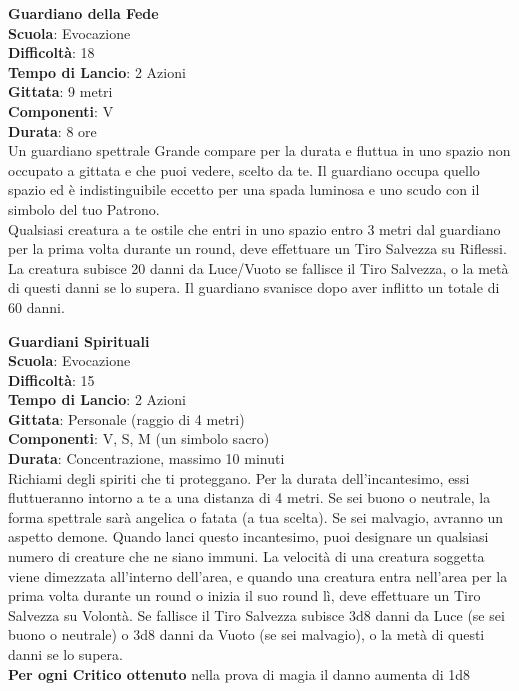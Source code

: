\begin{multicols}{2}
\medskip\textbf{Guardiano della Fede}\\
\textbf{Scuola}: Evocazione\\
\textbf{Difficoltà}: 18\\
\textbf{Tempo di Lancio}: 2 Azioni\\
\textbf{Gittata}: 9 metri\\
\textbf{Componenti}: V\\
\textbf{Durata}: 8 ore\\
Un guardiano spettrale Grande compare per la durata e fluttua in uno spazio non occupato a gittata e che puoi vedere, scelto da te. Il guardiano occupa quello spazio ed è indistinguibile eccetto per una spada luminosa e uno scudo con il simbolo del tuo Patrono.\\
Qualsiasi creatura a te ostile che entri in uno spazio entro 3 metri dal guardiano per la prima volta durante un round, deve effettuare un Tiro Salvezza su Riflessi. La creatura subisce 20 danni da Luce/Vuoto se fallisce il Tiro Salvezza, o la metà di questi danni se lo supera. Il guardiano svanisce dopo aver inflitto un totale di 60 danni.

\medskip\textbf{Guardiani Spirituali}\\
\textbf{Scuola}: Evocazione\\
\textbf{Difficoltà}: 15\\
\textbf{Tempo di Lancio}: 2 Azioni\\
\textbf{Gittata}: Personale (raggio di 4 metri)\\
\textbf{Componenti}: V, S, M (un simbolo sacro)\\
\textbf{Durata}: Concentrazione, massimo 10 minuti\\
Richiami degli spiriti che ti proteggano. Per la durata dell'incantesimo, essi fluttueranno intorno a te a una distanza di 4 metri. Se sei buono o neutrale, la forma spettrale sarà angelica o fatata (a tua scelta). Se sei malvagio, avranno un aspetto demone. Quando lanci questo incantesimo, puoi designare un qualsiasi numero di creature che ne siano immuni. La velocità di una creatura soggetta viene dimezzata all'interno dell'area, e quando una creatura entra nell'area per la prima volta durante un round o inizia il suo round lì, deve effettuare un Tiro Salvezza su Volontà. Se fallisce il Tiro Salvezza subisce 3d8 danni da Luce (se sei buono o neutrale) o 3d8 danni da Vuoto (se sei malvagio), o la metà di questi danni se lo supera.\\
\textbf{Per ogni Critico ottenuto} nella prova di magia il danno aumenta di 1d8 \\


\end{multicols}
